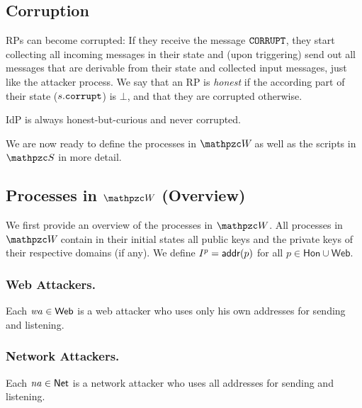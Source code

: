 \documentclass[letterpaper,onecolumn,10pt]{article}
\begin{document}

\subsection{Corruption}
RPs can become corrupted: If they receive the message
$\mathtt{CORRUPT}$, they start collecting all incoming messages in their state
and (upon triggering) send out all messages that are derivable from
their state and collected input messages, just like the attacker
process. We say that an RP is \emph{honest} if the according
part of their state ($s.\mathtt{corrupt}$) is $\bot$, and that they are
corrupted otherwise.

IdP is always honest-but-curious and never corrupted.

We are now ready to define the processes in $\websystem$ as well as
the scripts in $\scriptset$ in more detail. 

\subsection{Processes in $\bidsystem$ (Overview)}

We first provide an overview of the processes in $\bidsystem$. All
processes in $\websystem$ contain in their initial states all public
keys and the private keys of their respective domains (if any). We
define $I^p=\mathsf{addr}(p)$ for all $p\in \mathsf{Hon} \cup \mathsf{Web}$.

\subsubsection{Web Attackers.}  Each $\mathit{wa} \in \mathsf{Web}$  is a
web attacker who uses only his own addresses for sending and listening. 

\subsubsection{Network Attackers.}  Each $\mathit{na} \in \mathsf{Net}$  is a
network attacker who uses all addresses for sending and listening. 
\end{document}
